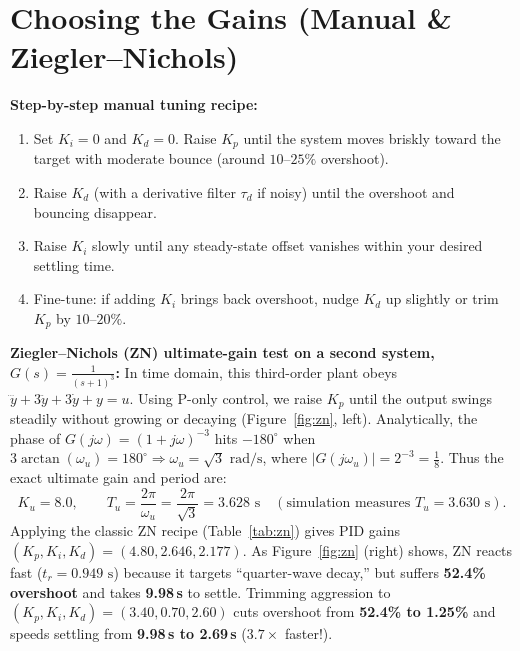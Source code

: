 \documentclass[10pt,a4paper]{article}
\begin{document}
\section{Choosing the Gains (Manual \& Ziegler--Nichols)}
\textbf{Step-by-step manual tuning recipe:}
\begin{enumerate}
  \item Set $K_i = 0$ and $K_d = 0$. Raise $K_p$ until the system moves briskly toward the target with moderate bounce (around $10\text{--}25\%$ overshoot).
  \item Raise $K_d$ (with a derivative filter $\tau_d$ if noisy) until the overshoot and bouncing disappear.
  \item Raise $K_i$ slowly until any steady-state offset vanishes within your desired settling time.
  \item Fine-tune: if adding $K_i$ brings back overshoot, nudge $K_d$ up slightly or trim $K_p$ by $10\text{--}20\%$.
\end{enumerate}

\textbf{Ziegler--Nichols (ZN) ultimate-gain test on a second system, $G(s) = \frac{1}{(s+1)^3}$:}
In time domain, this third-order plant obeys $\dddot{y} + 3\ddot{y} + 3\dot{y} + y = u$. Using P-only control, we raise $K_p$ until the output swings steadily without growing or decaying (Figure~\ref{fig:zn}, left). Analytically, the phase of $G(j\omega) = (1+j\omega)^{-3}$ hits $-180^\circ$ when $3\arctan(\omega_u) = 180^\circ \Rightarrow \omega_u = \sqrt{3}\text{ rad/s}$, where $|G(j\omega_u)| = 2^{-3} = \tfrac{1}{8}$. Thus the exact ultimate gain and period are:
\[
  K_u = 8.0, \qquad T_u = \frac{2\pi}{\omega_u} = \frac{2\pi}{\sqrt{3}} = 3.628\text{ s} \quad (\text{simulation measures } T_u = 3.630\text{ s}).
\]
Applying the classic ZN recipe (Table~\ref{tab:zn}) gives PID gains $(K_p, K_i, K_d) = (4.80, 2.646, 2.177)$. As Figure~\ref{fig:zn} (right) shows, ZN reacts fast ($t_r = 0.949\text{ s}$) because it targets ``quarter-wave decay,'' but suffers \textbf{52.4\% overshoot} and takes \textbf{9.98\,s} to settle. Trimming aggression to \textbf{$(K_p, K_i, K_d) = (3.40, 0.70, 2.60)$} cuts overshoot from \textbf{52.4\% to 1.25\%} and speeds settling from \textbf{9.98\,s to 2.69\,s} ($3.7\times$ faster!).
\end{document}
